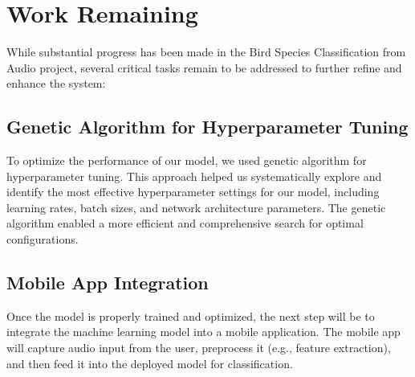 \newpage


\section{Work Remaining}
While substantial progress has been made in the Bird Species Classification
from Audio project, several critical tasks remain to be addressed to further refine and enhance the system:



\subsection{Genetic Algorithm for Hyperparameter Tuning}
To optimize the performance of our model, we used genetic algorithm for hyperparameter tuning. This approach helped us systematically explore and identify the most effective hyperparameter settings for our model, including learning rates, batch sizes, and network architecture parameters. The genetic algorithm enabled a more efficient and comprehensive search for optimal configurations.

\subsection{Mobile App Integration}
Once the model is properly trained and optimized, the next step will be to integrate the machine learning model into a mobile application. The mobile app will capture audio input from the user, preprocess it (e.g., feature extraction), and then feed it into the deployed model for classification.

